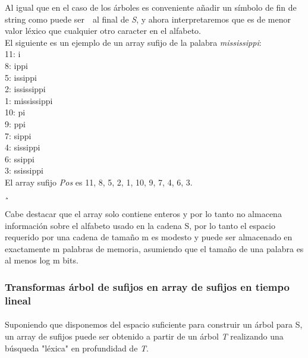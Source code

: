 \documentclass[es]{ifirak}
\begin{document}
Al igual que en el caso de los árboles es conveniente añadir un símbolo de fin de string como  puede ser $ $ \textdollar  $ $ al final de \textit{S}, y ahora interpretaremos que es de menor valor léxico que cualquier otro caracter en el alfabeto. \\

\pagebreak
El siguiente es un ejemplo de un array sufijo de la palabra \textit{mississippi}:\\

\hspace*{2cm}11:  i \\
\hspace*{2.6cm} 8:  ippi \\
\hspace*{2.6cm} 5:  issippi \\
\hspace*{2.6cm} 2:  ississippi \\
\hspace*{2.6cm} 1:  mississippi \\
\hspace*{2.6cm}10:  pi \\
\hspace*{2.6cm} 9:  ppi \\
\hspace*{2.6cm} 7:  sippi \\
\hspace*{2.6cm} 4:  sissippi \\
\hspace*{2.6cm} 6:  ssippi  \\
\hspace*{2.6cm} 3:  ssissippi \\

El array sufijo \textit{Pos} es 11, 8, 5, 2, 1, 10, 9, 7, 4, 6, 3.\\¸

Cabe destacar que el array solo contiene enteros y por lo tanto no almacena información sobre el alfabeto usado en la cadena S, por lo tanto el espacio requerido por una cadena de tamaño m es modesto y puede ser almacenado en exactamente m palabras de memoria, asumiendo que el tamaño de una palabra es al menos log m bits.

\subsubsection{Transformas árbol de sufijos en array de sufijos en tiempo lineal}

\paragraph{}
Suponiendo que disponemos del espacio suficiente para construir un árbol para S, un array de sufijos puede ser obtenido a partir de un árbol \textit{T} realizando una búsqueda "léxica" en profundidad de \textit{T}.\\
\end{document}
